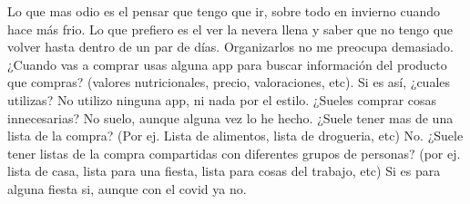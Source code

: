 \begin{description}
    \resp Lo que mas odio es el pensar que tengo que ir, sobre todo en invierno cuando hace más frio. Lo que prefiero es el ver la nevera llena y saber que no tengo que volver hasta dentro de un par de días.
    Organizarlos no me preocupa demasiado.
    \preg ¿Cuando vas a comprar usas alguna app para buscar información del producto que compras? (valores nutricionales, precio, valoraciones, etc). Si es así, ¿cuales utilizas?
    \resp No utilizo ninguna app, ni nada por el estilo.
    \preg ¿Sueles comprar cosas innecesarias?
    \resp No suelo, aunque alguna vez lo he hecho.
    \preg ¿Suele tener mas de una lista de la compra? (Por ej. Lista de alimentos, lista de drogueria, etc) 
    \resp No.
    \preg ¿Suele tener listas de la compra compartidas con diferentes grupos de personas? (por ej. lista de casa, lista para una fiesta, lista para cosas del trabajo, etc)
    \resp Si es para alguna fiesta si, aunque con el covid ya no.
\end{description}

